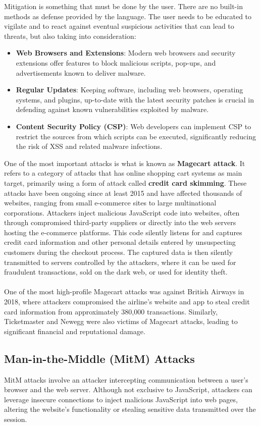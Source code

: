 \documentclass{article}
\begin{document}
Mitigation is something that must be done by the user. There are no built-in methods as defense provided by the language. The user needs to be educated to vigilate and to react against eventual suspicious activities that can lead to threats, but also taking into consideration:
\begin{itemize}
	\item \textbf{Web Browsers and Extensions}: Modern web browsers and security extensions offer features to block malicious scripts, pop-ups, and advertisements known to deliver malware.
	\item \textbf{Regular Updates}: Keeping software, including web browsers, operating systems, and plugins, up-to-date with the latest security patches is crucial in defending against known vulnerabilities exploited by malware.
	\item \textbf{Content Security Policy (CSP)}: Web developers can implement CSP to restrict the sources from which scripts can be executed, significantly reducing the risk of XSS and related malware infections.
\end{itemize}

One of the most important attacks is what is known as \textbf{Magecart attack}. It refers to a category of attacks that has online shopping cart systems as main target, primarily using a form of attack called \textbf{credit card skimming}. These attacks have been ongoing since at least 2015 and have affected thousands of websites, ranging from small e-commerce sites to large multinational corporations. Attackers inject malicious JavaScript code into websites, often through compromised third-party suppliers or directly into the web servers hosting the e-commerce platforms. This code silently listens for and captures credit card information and other personal details entered by unsuspecting customers during the checkout process. The captured data is then silently transmitted to servers controlled by the attackers, where it can be used for fraudulent transactions, sold on the dark web, or used for identity theft.
\\
\\
One of the most high-profile Magecart attacks was against British Airways in 2018, where attackers compromised the airline's website and app to steal credit card information from approximately 380,000 transactions. Similarly, Ticketmaster and Newegg were also victims of Magecart attacks, leading to significant financial and reputational damage.

\subsection{Man-in-the-Middle (MitM) Attacks}
MitM attacks involve an attacker intercepting communication between a user's browser and the web server. Although not exclusive to JavaScript, attackers can leverage insecure connections to inject malicious JavaScript into web pages, altering the website's functionality or stealing sensitive data transmitted over the session.
\end{document}
